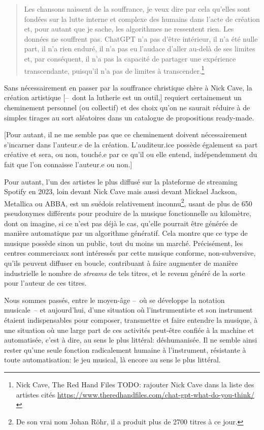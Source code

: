 \begin{quotation}
Les chansons naissent de la souffrance, je veux dire par cela qu'elles sont fondées sur la lutte interne et complexe des humains dans l'acte de création et, pour autant que je sache, les algorithmes ne ressentent rien. Les données ne souffrent pas. ChatGPT n'a pas d'être intérieur, il n'a été nulle part, il n'a rien enduré, il n'a pas eu l'audace d'aller au-delà de ses limites et, par conséquent, il n'a pas la capacité de partager une expérience transcendante, puisqu'il n'a pas de limites à transcender.\footnote{Nick Cave, The Red Hand Files TODO: rajouter Nick Cave dans la liste des artistes cités \url{https://www.theredhandfiles.com/chat-gpt-what-do-you-think/}}
\end{quotation}

Sans nécessairement en passer par la souffrance christique chère à Nick Cave, la création artistique [--~dont la lutherie est un outil,] requiert certainement un cheminement personnel (ou collectif) et des choix qu'on ne saurait réduire à de simples tirages au sort aléatoires dans un catalogue de propositions ready-made.

[Pour autant, il ne me semble pas que ce cheminement doivent nécessairement s'incarner dans l'auteur.e de la création. L'auditeur.ice possède également sa part créative et sera, ou non, touché.e par ce qu'il ou elle entend, indépendemment du fait que l'on connaisse l'auteur.e ou non.]

Pour autant, l'un des artistes le plus diffusé sur la plateforme de streaming Spotify en 2023, loin devant Nick Cave mais aussi devant Mickael Jackson, Metallica ou ABBA, est un suédois relativement inconnu\footnote{De son vrai nom Johan Röhr, il a produit plus de 2700 titres à ce jour.}, usant de plus de 650 pseudonymes différents pour produire de la musique fonctionnelle au kilomètre, dont on imagine, si ce n'est pas déjà le cas, qu'elle pourrait être générée de manière automatique par un algorithme génératif. Cela montre que ce type de musique possède sinon un public, tout du moins un marché. Précisément, les centres commerciaux sont intéressés par cette musique conforme, non-subversive, qu'ils peuvent diffuser en boucle, contribuant à faire augmenter de manière industrielle le nombre de \textit{streams} de tels titres, et le revenu généré de la sorte pour l'auteur de ces titres.


Nous sommes passés, entre le moyen-âge --~où se développe la notation musicale~-- et aujourd'hui, d'une situation où l'instrumentiste et son instrument étaient indispensables pour composer, transmettre et faire entendre la musique, à une situation où une large part de ces activités peut-être confiée à la machine et automatisée, c'est à dire, au sens le plus littéral: déshumanisée.
Il ne semble ainsi rester qu'une seule fonction radicalement humaine à l'instrument, résistante à toute automatisation: le jeu musical, là encore au sens le plus littéral.

